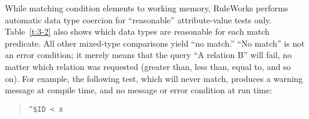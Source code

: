 While matching condition elements to working memory, RuleWorks
performs automatic data type coercion for ``reasonable''
attribute-value tests only. Table~\ref{t:3-2} also shows which data types are
reasonable for each match predicate. All other mixed-type comparisons
yield ``no match.'' ``No match'' is not an error condition; it merely
means that the query ``A relation B'' will fail, no matter which
relation was requested (greater than, less than, equal to, and so
on). For example, the following test, which will never match, produces
a warning message at compile time, and no message or error condition
at run time:
\begin{quote}
\begin{verbatim}
^$ID < x
\end{verbatim}
\end{quote}

